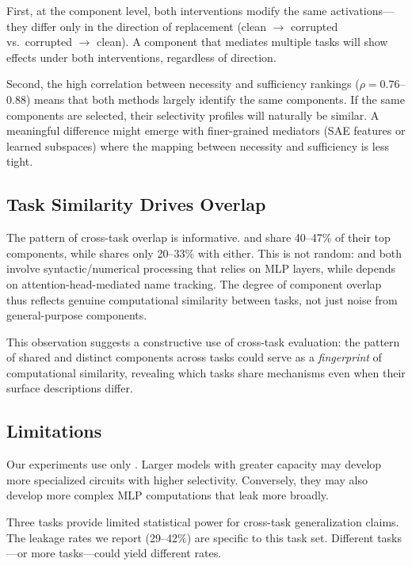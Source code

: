 First, at the component level, both interventions modify the same activations---they differ only in the direction of replacement (clean $\rightarrow$ corrupted vs.\ corrupted $\rightarrow$ clean). A component that mediates multiple tasks will show effects under both interventions, regardless of direction.

Second, the high correlation between necessity and sufficiency rankings ($\rho = 0.76$--$0.88$) means that both methods largely identify the same components. If the same components are selected, their selectivity profiles will naturally be similar. A meaningful difference might emerge with finer-grained mediators (\eg SAE features or learned subspaces) where the mapping between necessity and sufficiency is less tight.

\subsection{Task Similarity Drives Overlap}
\label{sec:task_similarity}

The pattern of cross-task overlap is informative. \sva and \gt share 40--47\% of their top components, while \ioi shares only 20--33\% with either. This is not random: \sva and \gt both involve syntactic/numerical processing that relies on MLP layers, while \ioi depends on attention-head-mediated name tracking. The degree of component overlap thus reflects genuine computational similarity between tasks, not just noise from general-purpose components.

This observation suggests a constructive use of cross-task evaluation: the pattern of shared and distinct components across tasks could serve as a \emph{fingerprint} of computational similarity, revealing which tasks share mechanisms even when their surface descriptions differ.

\subsection{Limitations}
\label{sec:limitations}

 Our experiments use only \gptsmall. Larger models with greater capacity may develop more specialized circuits with higher selectivity. Conversely, they may also develop more complex MLP computations that leak more broadly.

 Three tasks provide limited statistical power for cross-task generalization claims. The leakage rates we report (29--42\%) are specific to this task set. Different tasks---or more tasks---could yield different rates.

